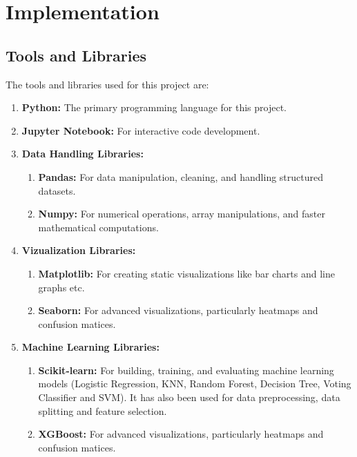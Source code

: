 \documentclass[12pt]{report}
\begin{document}
\chapter{Implementation}
\section{Tools and Libraries}
The tools and libraries used for this project are:
\vspace{-1.25em}
\begin{enumerate}
	\setlength\itemsep{-1.05em}
	\item{\textbf{Python:}} The primary programming language for this project.
	\item{\textbf{Jupyter Notebook:}} For interactive code development.
	\item{\textbf{Data Handling Libraries:}}
		\vspace{-1.5em}
		\begin{enumerate}
			\setlength\itemsep{-1.5em}
			\item{\textbf{Pandas:}} For data manipulation, cleaning, and handling structured datasets.
			\item{\textbf{Numpy:}} For numerical operations, array manipulations, and faster mathematical computations.
		\end{enumerate}
	\item{\textbf{Vizualization Libraries: }}
		\vspace{-1.5em}
		\begin{enumerate}
			\setlength\itemsep{-1.5em}
			\item{\textbf{Matplotlib:}} For creating static visualizations like bar charts and line graphs etc.
			\item{\textbf{Seaborn:}} For advanced visualizations, particularly heatmaps and confusion matices.
		\end{enumerate}
	\item{\textbf{Machine Learning Libraries: }}
		\vspace{-1.5em}
		\begin{enumerate}
			\setlength\itemsep{-1.5em}
			\item{\textbf{Scikit-learn:}} For building, training, and evaluating machine learning models (Logistic Regression, KNN, Random Forest, Decision Tree, Voting Classifier and SVM). It has also been used for data preprocessing, data splitting and feature selection.
			\item{\textbf{XGBoost:}} For advanced visualizations, particularly heatmaps and confusion matices.
		\end{enumerate}
\end{enumerate}
\end{document}

